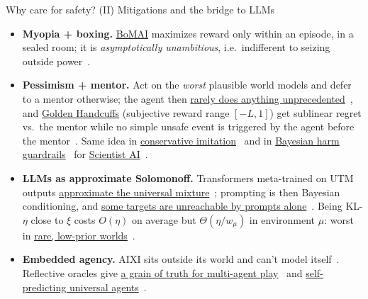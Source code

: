 \documentclass[10pt,aspectratio=169]{beamer}
\begin{document}
\begin{frame}{Why care for safety? (II) Mitigations and the bridge to LLMs}
\small
\begin{itemize}
    \item \textbf{Myopia + boxing.} \href{https://arxiv.org/abs/1905.12186}{BoMAI} maximizes reward only within an episode, in a sealed room;
    it is \emph{asymptotically unambitious}, i.e.\ indifferent to seizing outside power~.
    \pause
    \item \textbf{Pessimism + mentor.} Act on the \emph{worst} plausible world models and defer to a mentor otherwise;
    the agent then \href{https://arxiv.org/abs/2006.08753}{rarely does anything unprecedented}~, and
    \href{https://arxiv.org/abs/2604.13609}{Golden Handcuffs} (subjective reward range $[-L,1]$) get sublinear regret vs.\ the mentor while
    no simple unsafe event is triggered by the agent before the mentor~.
    Same idea in \href{https://www.jmlr.org/papers/v23/21-0618.html}{conservative imitation}~
    and in \href{https://proceedings.mlr.press/v286/bengio25a.html}{Bayesian harm guardrails}~ for \href{https://arxiv.org/abs/2502.15657}{Scientist AI}~.
    \pause
    \item \textbf{LLMs as approximate Solomonoff.} Transformers meta-trained on UTM outputs
    \href{https://arxiv.org/abs/2401.14953}{approximate the universal mixture}~;
    prompting is then Bayesian conditioning, and \href{https://arxiv.org/abs/2505.17010}{some targets are unreachable by prompts alone}~.
    Being KL-$\eta$ close to $\xi$ costs $O(\eta)$ on average but $\Theta(\eta/w_\mu)$ in environment $\mu$: worst in
    \href{https://arxiv.org/abs/2610.29289}{rare, low-prior worlds}~.
    \pause
    \item \textbf{Embedded agency.} AIXI sits outside its world and can't model itself~.
    Reflective oracles give \href{https://arxiv.org/abs/2508.16245}{a grain of truth for multi-agent play}~
    and \href{https://arxiv.org/abs/2511.22226}{self-predicting universal agents}~.
\end{itemize}
\end{frame}
\end{document}
